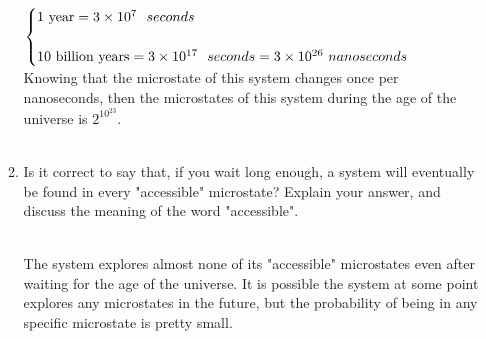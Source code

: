\documentclass[fleqn]{article}
\begin{document}
\begin{enumerate}
\begin{enumerate}
        \textcolor{hwColor}{
          \\
          $
            \begin{cases}
              \text{1 year}=3 \times 10^7 ~~ seconds
              \\
              \\
              \text{10 billion years}=3 \times 10^{17} ~~ seconds=3 \times 10^{26} ~ nanoseconds
            \end{cases}
            \\
            \\
          $
          Knowing that the microstate of this system changes once per nanoseconds, then the microstates of this system during 
          the age of the universe is $2^{{10}^{23}}$.
          \\
          \\
        }

      \item Is it correct to say that, if you wait long enough, a system will eventually be found in every "accessible" microstate?
      Explain your answer, and discuss the meaning of the word "accessible".

        \textcolor{hwColor}{
          \\
          The system explores almost none of its "accessible" microstates even after waiting for the age of the universe. 
          It is possible the system at some point explores any microstates in the future, but the probability of being in any
          specific microstate is pretty small.
          \\
        }
        
    \end{enumerate}
  \end{enumerate}
\end{document}
